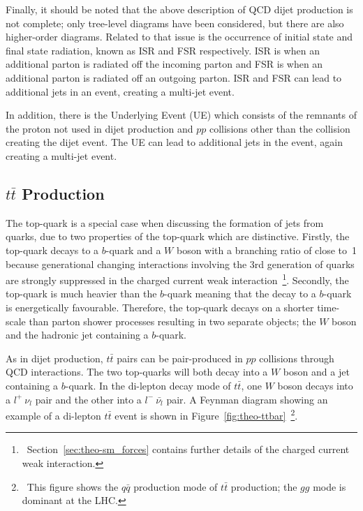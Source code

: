 Finally, it should be noted that the above description of QCD dijet production is not complete;
only tree-level diagrams have been considered, but there are also higher-order diagrams.
Related to that issue is the occurrence of initial state and final state radiation, known as ISR and FSR respectively.
ISR is when an additional parton is radiated off the incoming parton and FSR is when an additional parton is radiated off an outgoing parton.
ISR and FSR can lead to additional jets in an event, creating a multi-jet event.

In addition, there is the Underlying Event (UE) which consists of the remnants of the proton not used in dijet production
and $pp$ collisions other than the collision creating the dijet event.
The UE can lead to additional jets in the event, again creating a multi-jet event.

\subsection{$t\bar{t}$ Production}
\label{sec:theo-ttbar}

The top-quark is a special case when discussing the formation of jets from quarks,
due to two properties of the top-quark which are distinctive.
Firstly, the top-quark decays to a $b$-quark and a $W$ boson with a branching ratio of close to~1
because generational changing interactions involving the 3rd generation of quarks
are strongly suppressed in the charged current weak interaction~\footnote{\ Section~\ref{sec:theo-sm_forces} contains further details of the charged current weak interaction.}.
Secondly, the top-quark is much heavier than the $b$-quark
meaning that the decay to a $b$-quark is energetically favourable.
Therefore, the top-quark decays on a shorter time-scale than parton shower processes
resulting in two separate objects; the $W$ boson and the hadronic jet containing a $b$-quark.

As in dijet production, $t\bar{t}$ pairs can be pair-produced in $pp$ collisions through QCD interactions.
The two top-quarks will both decay into a $W$ boson and a jet containing a $b$-quark.
In the di-lepton decay mode of $t\bar{t}$, one $W$ boson decays into a $l^+~\nu_l$ pair and the other into a $l^{-}~\bar{\nu_l}$ pair.
A Feynman diagram showing an example of a di-lepton $t\bar{t}$ event is shown in
Figure~\ref{fig:theo-ttbar}~\footnote{\ This figure shows the $q\bar{q}$ production mode of $t\bar{t}$ production; the $gg$ mode is dominant at the LHC.}.

